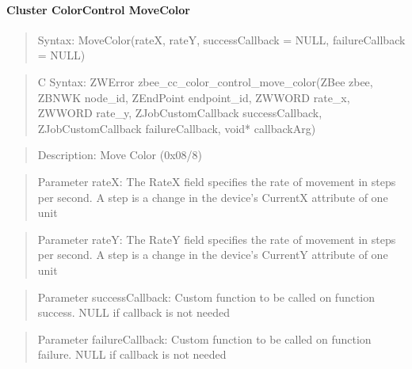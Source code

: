 \paragraph{Cluster ColorControl MoveColor}
\begin{quote}Syntax: MoveColor(rateX, rateY, successCallback = NULL, failureCallback = NULL)\end{quote}
\begin{quote}C Syntax: ZWError zbee\_cc\_color\_control\_move\_color(ZBee zbee, ZBNWK node\_id, ZEndPoint endpoint\_id, ZWWORD rate\_x, ZWWORD rate\_y, ZJobCustomCallback successCallback, ZJobCustomCallback failureCallback, void* callbackArg)\end{quote}
\begin{quote}Description: Move Color (0x08/8)\end{quote}
\begin{quote}Parameter rateX: The RateX field specifies the rate of movement in steps per second. A step is a change in the device's CurrentX attribute of one unit\end{quote}
\begin{quote}Parameter rateY: The RateY field specifies the rate of movement in steps per second. A step is a change in the device's CurrentY attribute of one unit\end{quote}
\begin{quote}Parameter successCallback: Custom function to be called on function success. NULL if callback is not needed\end{quote}
\begin{quote}Parameter failureCallback: Custom function to be called on function failure. NULL if callback is not needed\end{quote}


